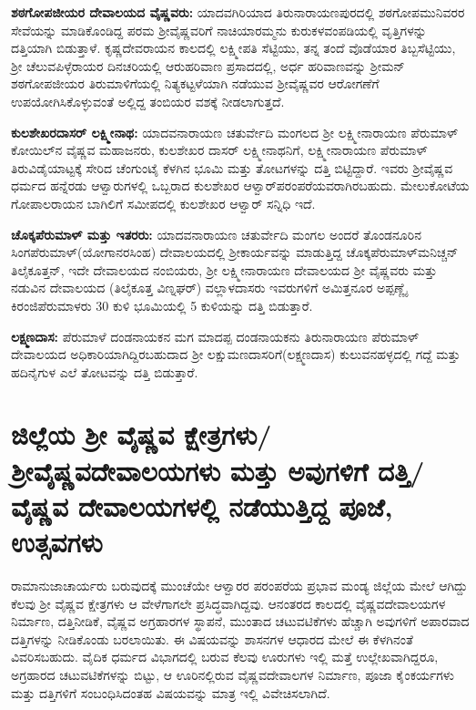 \textbf{ಶಠಗೋಪಜೀಯರ ದೇವಾಲಯದ ವೈಷ್ಣವರು:} ಯಾದವಗಿರಿಯಾದ ತಿರುನಾರಾಯಣಪುರದಲ್ಲಿ ಶಠಗೋಪಮುನಿವರರ ಸೇವೆಯನ್ನು ಮಾಡಿಕೊಂಡಿದ್ದ ಪರಮ ಶ‍್ರೀವೈಷ್ಣವರಿಗೆ ನಾಚಿಯಾರಮ್ಮನು ಕುರುಕಳವಂಪಡಿಯಲ್ಲಿ ವೃತ್ತಿಗಳನ್ನು ದತ್ತಿಯಾಗಿ ಬಿಡುತ್ತಾಳೆ. ಕೃಷ್ಣದೇವರಾಯನ ಕಾಲದಲ್ಲಿ ಲಕ್ಷ್ಮೀಪತಿ ಸೆಟ್ಟಿಯು, ತನ್ನ ತಂದೆ ವೊಡೆಯಾರ ತಿಬ್ಬಸೆಟ್ಟಿಯು, ಶ‍್ರೀ ಚೆಲುವಪಿಳ್ಳೆರಾಯರ ದಿನಚರಿಯಲ್ಲಿ ಆರುಹರಿವಾಣ ಪ್ರಸಾದದಲ್ಲಿ, ಅರ್ಧ ಹರಿವಾಣವನ್ನು ಶ‍್ರೀಮನ್​ ಶಠಗೋಪಜೀಯರ ತಿರುಮಾಳಿಗೆಯಲ್ಲಿ ನಿತ್ಯಕಟ್ಟಳೆಯಾಗಿ ನಡೆಯುವ ಶ‍್ರೀವೈಷ್ಣವರ ಆರೋಗಣೆಗೆ ಉಪಯೋಗಿಸಿಕೊಳ್ಳುವಂತೆ ಅಲ್ಲಿದ್ದ ತಂಬಿಯರ ವಶಕ್ಕೆ ನೀಡಲಾಗುತ್ತದೆ.

\textbf{ಕುಲಶೇಖರದಾಸರ್​ ಲಕ್ಷ್ಮೀನಾಥ:} ಯಾದವನಾರಾಯಣ ಚತುರ್ವೇದಿ ಮಂಗಲದ ಶ‍್ರೀ ಲಕ್ಷ್ಮೀನಾರಾಯಣ ಪೆರುಮಾಳ್​ ಕೋಯಿಲ್​ನ ವೈಷ್ಣವ ಮಹಾಜನರು, ಕುಲಶೇಖರ ದಾಸರ್​ ಲಕ್ಷ್ಮೀನಾಥನಿಗೆ, ಲಕ್ಷ್ಮೀನಾರಾಯಣ ಪೆರುಮಾಳ್​ ತಿರುವಿಡೈಯಾಟ್ಟಕ್ಕೆ ಸೇರಿದ ಚೆಂಗುಂಟೈ ಕೆಳಗಿನ ಭೂಮಿ ಮತ್ತು ತೋಟಗಳನ್ನು ದತ್ತಿ ಬಿಟ್ಟಿದ್ದಾರೆ. ಇವರು ಶ‍್ರೀವೈಷ್ಣವ ಧರ್ಮದ ಹನ್ನೆರಡು ಆಳ್ವಾರುಗಳಲ್ಲಿ ಒಬ್ಬರಾದ ಕುಲಶೇಖರ ಆಳ್ವಾರ್​ ಪರಂಪರೆಯವರಾಗಿರಬಹುದು. ಮೇಲುಕೋಟೆಯ ಗೋಪಾಲರಾಯನ ಬಾಗಿಲಿಗೆ ಸಮೀಪದಲ್ಲಿ ಕುಲಶೇಖರ ಆಳ್ವಾರ್​ ಸನ್ನಿಧಿ ಇದೆ.

\textbf{ಚೊಕ್ಕಪೆರುಮಾಳ್​ ಮತ್ತು ಇತರರು:} ಯಾದವನಾರಾಯಣ ಚತುರ್ವೇದಿ ಮಂಗಲ ಅಂದರೆ ತೊಂಡನೂರಿನ ಸಿಂಗಪೆರುಮಾಳ್​(ಯೋಗಾನರಸಿಂಹ) ದೇವಾಲಯದಲ್ಲಿ ಶ‍್ರೀಕಾರ್ಯವನ್ನು ಮಾಡುತ್ತಿದ್ದ ಚೊಕ್ಕಪೆರುಮಾಳ್​ ಮನಿಚ್ಚನ್​ ತಿಲೈಕೂತ್ತನ್​, ಇದೇ ದೇವಾಲಯದ ನಂಬಿಯರು, ಶ‍್ರೀ ಲಕ್ಷ್ಮೀನಾರಾಯಣ ದೇವಾಲಯದ ಶ‍್ರೀ ವೈಷ್ಣವರು ಮತ್ತು ನಡುವಿನ ದೇವಾಲಯದ (ತಿಲೈಕೂತ್ತ ವಿಣ್ನಘರ್​) ವಲ್ಲಾಳದಾಸರು ಇವರುಗಳಿಗೆ ಅಮಿತ್ತನೂರ ಅಪ್ಪಣ್ಣೈ ಕಿರಂಜಿಪೆರುಮಾಳರು 30 ಕುಳಿ ಭೂಮಿಯಲ್ಲಿ 5 ಕುಳಿಯನ್ನು ದತ್ತಿ ಬಿಡುತ್ತಾರೆ.

\textbf{ಲಕ್ಷ್ಮಣದಾಸ:} ಪೆರುಮಾಳೆ ದಂಡನಾಯಕನ ಮಗ ಮಾದಪ್ಪ ದಂಡನಾಯಕನು ತಿರುನಾರಾಯಣ ಪೆರುಮಾಳ್​ ದೇವಾಲಯದ ಅಧಿಕಾರಿಯಾಗಿದ್ದಿರಬಹುದಾದ ಶ‍್ರೀ ಲಕ್ಷುಮಣದಾಸರಿಗೆ(ಲಕ್ಷ್ಮಣದಾಸ) ಕುಲುವನಹಳ್ಳದಲ್ಲಿ ಗದ್ದೆ ಮತ್ತು ಹದಿನೈಗುಳ ಎಲೆ ತೋಟವನ್ನು ದತ್ತಿ ಬಿಡುತ್ತಾರೆ.


\section{ಜಿಲ್ಲೆಯ ಶ‍್ರೀ ವೈಷ್ಣವ ಕ್ಷೇತ್ರಗಳು/ ಶ‍್ರೀವೈಷ್ಣವದೇವಾಲಯಗಳು ಮತ್ತು ಅವುಗಳಿಗೆ ದತ್ತಿ/ವೈಷ್ಣವ ದೇವಾಲಯಗಳಲ್ಲಿ ನಡೆಯುತ್ತಿದ್ದ ಪೂಜೆ, ಉತ್ಸವಗಳು}

ರಾಮಾನುಜಾಚಾರ್ಯರು ಬರುವುದಕ್ಕೆ ಮುಂಚೆಯೇ ಆಳ್ವಾರರ ಪರಂಪರೆಯ ಪ್ರಭಾವ ಮಂಡ್ಯ ಜಿಲ್ಲೆಯ ಮೇಲೆ ಆಗಿದ್ದು ಕೆಲವು ಶ‍್ರೀ ವೈಷ್ಣವ ಕ್ಷೇತ್ರಗಳು ಆ ವೇಳೆಗಾಗಲೇ ಪ್ರಸಿದ್ಧವಾಗಿದ್ದವು. ಆನಂತರದ ಕಾಲದಲ್ಲಿ ವೈಷ್ಣವದೇವಾಲಯಗಳ ನಿರ್ಮಾಣ, ದತ್ತಿನೀಡಿಕೆ, ವೈಷ್ಣವ ಅಗ್ರಹಾರಗಳ ಸ್ಥಾಪನೆ, ಮುಂತಾದ ಚಟುವಟಿಕೆಗಳು ಹೆಚ್ಚಾಗಿ ಅವುಗಳಿಗೆ ಅಪಾರವಾದ ದತ್ತಿಗಳನ್ನು ನೀಡಿಕೊಂಡು ಬರಲಾಯಿತು. ಈ ವಿಷಯವನ್ನು ಶಾಸನಗಳ ಆಧಾರದ ಮೇಲೆ ಈ ಕೆಳಗಿನಂತೆ ವಿವರಿಸಬಹುದು. ವೈದಿಕ ಧರ್ಮದ ವಿಭಾಗದಲ್ಲಿ ಬರುವ ಕೆಲವು ಊರುಗಳು ಇಲ್ಲಿ ಮತ್ತೆ ಉಲ್ಲೇಖವಾಗಿದ್ದರೂ, ಅಗ್ರಹಾರದ ಚಟುವಟಿಕೆಗಳನ್ನು ಬಿಟ್ಟು, ಆ ಊರಿನಲ್ಲಿರುವ ವೈಷ್ಣವದೇವಾಲಗಳ ನಿರ್ಮಾಣ, ಪೂಜಾ ಕೈಂಕರ್ಯಗಳು ಮತ್ತು ದತ್ತಿಗಳಿಗೆ ಸಂಬಂಧಿಸಿದಂತಹ ವಿಷಯವನ್ನು ಮಾತ್ರ ಇಲ್ಲಿ ವಿವೇಚಿಸಲಾಗಿದೆ.

